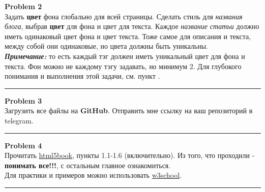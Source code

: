 \documentclass[a4paper, 11pt]{extarticle}
\newenvironment{problem}[2][Problem]
    { \begin{mdframed}[backgroundcolor=gray!20] \textbf{#1 #2} \\}
    {  \end{mdframed}}
\newenvironment{solution}
    {\textit{Solution:}}
    {}
\begin{document}

\begin{problem}{2}
Задать \textbf{цвет} фона глобально для всей страницы. Сделать стиль для \textit{названия блога}, выбрав \textbf{цвет} для фона и цвет для текста. Каждое \textit{название статьи} должно иметь одинаковый цвет фона и цвет текста. Тоже самое для описания и текста, между собой они одинаковые, но цвета должны быть уникальны.\\
\textit{\textbf{Примечание: }}то есть каждый тэг должен иметь уникальный цвет для фона и текста. Фон можно не каждому тэгу задавать, но минимум 2. Для глубокого понимания и выполнения этой задачи, см. пункт \cite{problem4}.
\end{problem}
\noindent\rule{6.257in}{2.8pt}

\begin{problem}{3}
Загрузить все файлы на \textbf{GitHub}. Отправить мне ссылку на ваш репозиторий в telegram.
\end{problem}
\noindent\rule{6.257in}{2.8pt}

\begin{problem}{4}\label{problem4}
Прочитать \href{https://html5book.ru/html-html5}{html5book}, пункты 1.1-1.6 (включительно). Из того, что проходили - \textbf{понимать все!!!}, с остальным главное ознакомиться.\\
Для практики и примеров можно использовать \href{https://www.w3schools.com}{w3school}. 
\end{problem}
\noindent\rule{6.257in}{2.8pt}
\end{document}
